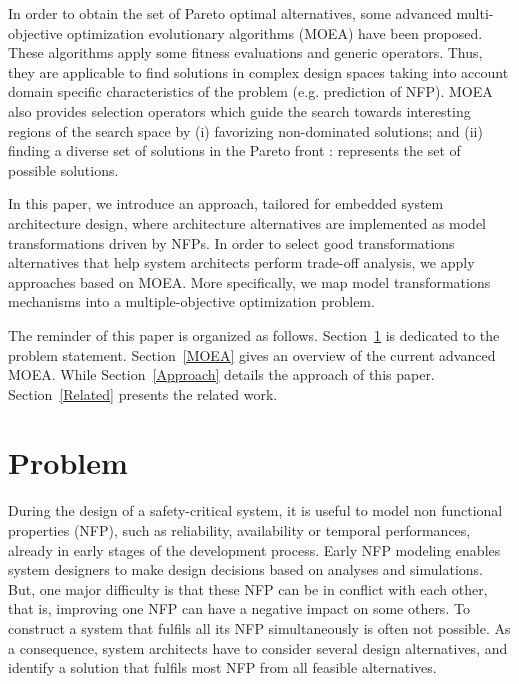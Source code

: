 \documentclass[conference]{IEEEtran}
\begin{document}
In order to obtain the set of Pareto optimal alternatives, some advanced multi-objective optimization evolutionary algorithms (MOEA) have been proposed. These algorithms apply some fitness evaluations and generic operators. Thus, they are applicable to find solutions in complex design spaces taking into account domain specific characteristics of the problem (e.g. prediction of NFP). MOEA also provides selection operators which guide the search towards interesting regions of the search space by (i) favorizing non-dominated solutions; and (ii) finding a diverse set of solutions in the Pareto front : represents the set of possible solutions.

In this paper, we introduce an approach, tailored for embedded system architecture design, where architecture alternatives are implemented as model transformations driven by NFPs. In order to select good transformations alternatives that help system architects perform trade-off analysis, we apply approaches based on MOEA. More specifically, we map model transformations mechanisms into a multiple-objective optimization problem.


The reminder of this paper is organized as follows. Section~\ref{Problem} is dedicated to the problem statement. Section~\ref{MOEA} gives an overview of the current advanced MOEA. While Section~\ref{Approach} details the approach of this paper. Section~\ref{Related} presents the related work.

\section{Problem}
\label{Problem}
During the design of a safety-critical system, it is useful to model non functional properties (NFP), such as reliability, availability or temporal performances, already in early stages of the development process. Early NFP modeling enables system designers to make design decisions based on analyses and simulations. But, one major difficulty is that these NFP can be in conflict with each other, that is, improving one NFP can have a negative impact on some others. To construct a system that fulfils all its NFP simultaneously is often not possible. As a consequence, system architects have to consider several design alternatives, and identify a solution that fulfils most NFP from all feasible alternatives. 
\end{document}
